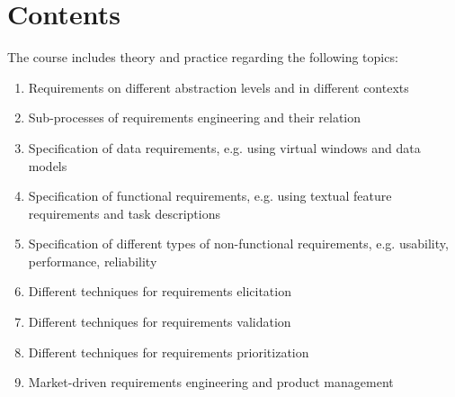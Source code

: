 \section{Contents}
The course includes theory and practice regarding the following topics:
\begin{enumerate}[noitemsep]
\item Requirements on different abstraction levels and in different contexts

\item Sub-processes of requirements engineering and their relation

\item Specification of data requirements, e.g. using virtual windows and data models

\item Specification of functional requirements, e.g. using textual feature requirements and task descriptions

\item Specification of different types of non-functional requirements, e.g. usability, performance, reliability

\item Different techniques for requirements elicitation

\item Different techniques for requirements validation

\item Different techniques for requirements prioritization

\ifteknolog
	\item Market-driven requirements engineering and product management
\fi
\end{enumerate}

\newpage


